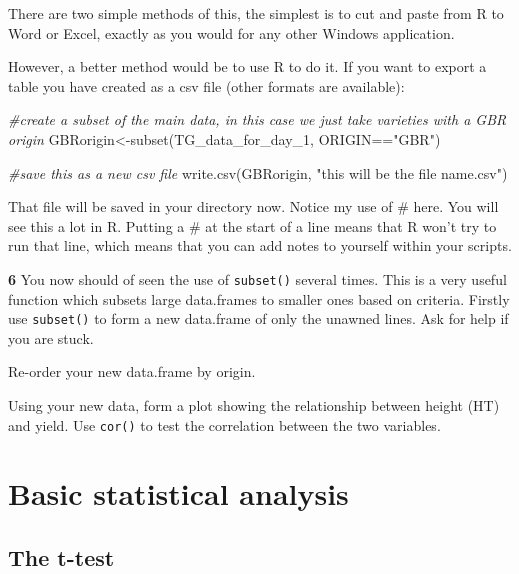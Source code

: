 \documentclass[
]{book}
\makeatletter
\newenvironment{Shaded}{\begin{snugshade}}{\end{snugshade}}
\newcommand{\CommentTok}[1]{\textcolor[rgb]{0.56,0.35,0.01}{\textit{#1}}}
\newcommand{\FunctionTok}[1]{\textcolor[rgb]{0.00,0.00,0.00}{#1}}
\newcommand{\NormalTok}[1]{#1}
\newcommand{\OtherTok}[1]{\textcolor[rgb]{0.56,0.35,0.01}{#1}}
\newcommand{\SpecialCharTok}[1]{\textcolor[rgb]{0.00,0.00,0.00}{#1}}
\newcommand{\StringTok}[1]{\textcolor[rgb]{0.31,0.60,0.02}{#1}}
\newenvironment{kframe}{%
\medskip{}
\setlength{\fboxsep}{.8em}
 \def\at@end@of@kframe{}%
 \ifinner\ifhmode%
  \def\at@end@of@kframe{\end{minipage}}%
  \begin{minipage}{\columnwidth}%
 \fi\fi%
 \def\FrameCommand##1{\hskip\@totalleftmargin \hskip-\fboxsep
 \colorbox{shadecolor}{##1}\hskip-\fboxsep
     \hskip-\linewidth \hskip-\@totalleftmargin \hskip\columnwidth}%
 \MakeFramed {\advance\hsize-\width
   \@totalleftmargin\z@ \linewidth\hsize
   \@setminipage}}%
 {\par\unskip\endMakeFramed%
 \at@end@of@kframe}
\newenvironment{rmdblock}[1]
  {
  \begin{itemize}
  \renewcommand{\labelitemi}{
    \raisebox{-.7\height}[0pt][0pt]{
      {\setkeys{Gin}{width=3em,keepaspectratio}\texttt{[image: images/\#1]}}
    }
  }
  \setlength{\fboxsep}{1em}
  \begin{kframe}
  \item
  }
  {
  \end{kframe}
  \end{itemize}
  }
\newenvironment{rmdquiz}
  {\begin{rmdblock}{quiz}}
  {\end{rmdblock}}
\newenvironment{rmdtip}
  {\begin{rmdblock}{tip}}
  {\end{rmdblock}}
\makeatother
\begin{document}
There are two simple methods of this, the simplest is to cut and paste from R to Word or Excel, exactly as you would for any other Windows application.

However, a better method would be to use R to do it. If you want to export a table you have created as a csv file (other formats are available):

\begin{Shaded}
\begin{Highlighting}[]
\CommentTok{\#create a subset of the main data, in this case we just take varieties with a GBR origin}
\NormalTok{GBRorigin}\OtherTok{\textless{}{-}}\FunctionTok{subset}\NormalTok{(TG\_data\_for\_day\_1, ORIGIN}\SpecialCharTok{==}\StringTok{"GBR"}\NormalTok{)}

\CommentTok{\#save this as a new csv file}
\FunctionTok{write.csv}\NormalTok{(GBRorigin, }\StringTok{"this will be the file name.csv"}\NormalTok{)}
\end{Highlighting}
\end{Shaded}

\begin{rmdtip}
That file will be saved in your directory now. Notice my use of \# here. You will see this a lot in R. Putting a \# at the start of a line means that R won't try to run that line, which means that you can add notes to yourself within your scripts.
\end{rmdtip}

\begin{rmdquiz}
\textbf{6} You now should of seen the use of \texttt{subset()} several times. This is a very useful function which subsets large data.frames to smaller ones based on criteria. Firstly use \texttt{subset()} to form a new data.frame of only the unawned lines. Ask for help if you are stuck.

Re-order your new data.frame by origin.

Using your new data, form a plot showing the relationship between height (HT) and yield.
Use \texttt{cor()} to test the correlation between the two variables.
\end{rmdquiz}

\hypertarget{basic-statistical-analysis}{%
\section{Basic statistical analysis}\label{basic-statistical-analysis}}

\hypertarget{the-t-test}{%
\subsection{The t-test}\label{the-t-test}}
\end{document}
